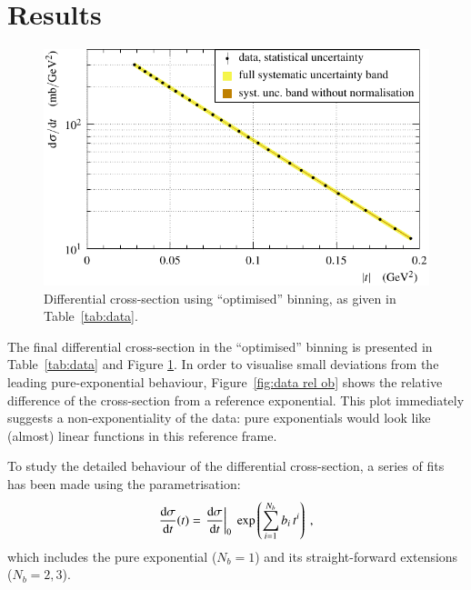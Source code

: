 \section{Results}
\label{sec:results}


\begin{figure}
\begin{center}
\includegraphics{fig/t_dist.pdf}
\caption{%
Differential cross-section using ``optimised'' binning, as given in Table~\ref{tab:data}.
}
\label{fig:data ob}
\end{center}
\end{figure}


The final differential cross-section in the ``optimised'' binning is presented in Table~\ref{tab:data} and Figure \ref{fig:data ob}. In order to visualise small deviations from the leading pure-exponential behaviour, Figure~\ref{fig:data rel ob} shows the relative difference of the cross-section from a reference exponential. This plot immediately suggests a non-exponentiality of the data: pure exponentials would look like (almost) linear functions in this reference frame.

To study the detailed behaviour of the differential cross-section, a series of fits has been made using the parametrisation:
\begin{equation}
\label{eq:fit param}
{\d\sigma\over\d t}(t) = \left. \d\sigma\over\d t\right|_{0} \ \exp\left( \sum\limits_{i = 1}^{N_{b}} b_i\, t^i \right) \ ,
\end{equation}
which includes the pure exponential ($N_b = 1$) and its straight-forward extensions ($N_b = 2, 3$).

